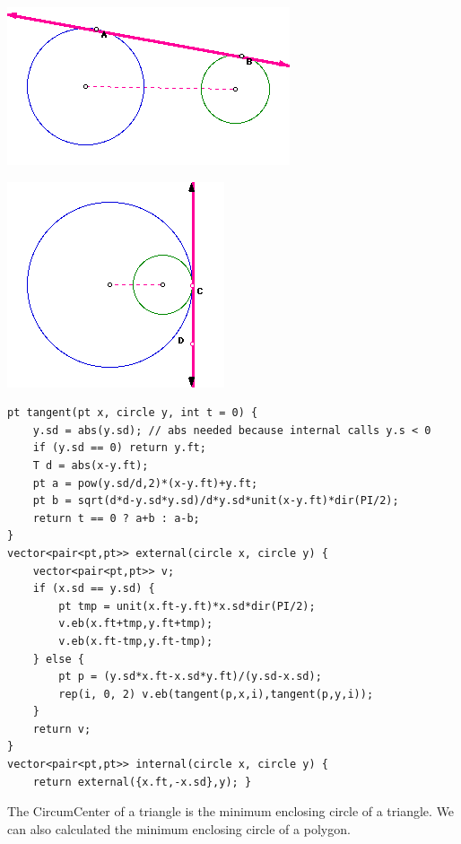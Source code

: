     
    \begin{center}
    \begin{minipage}{.5\textwidth}
    \centering
    \includegraphics[scale = 0.5]{imgs/external1.png}
    \end{minipage}%
    \begin{minipage}{0.5\textwidth}
    \centering
    \includegraphics[scale = 0.5]{imgs/external2.png}
    \end{minipage}
    \end{center}
    
    \begin{lstlisting}
pt tangent(pt x, circle y, int t = 0) {
	y.sd = abs(y.sd); // abs needed because internal calls y.s < 0
	if (y.sd == 0) return y.ft;
	T d = abs(x-y.ft);
	pt a = pow(y.sd/d,2)*(x-y.ft)+y.ft;
	pt b = sqrt(d*d-y.sd*y.sd)/d*y.sd*unit(x-y.ft)*dir(PI/2); 
	return t == 0 ? a+b : a-b;
}
vector<pair<pt,pt>> external(circle x, circle y) { 
	vector<pair<pt,pt>> v; 
	if (x.sd == y.sd) {
		pt tmp = unit(x.ft-y.ft)*x.sd*dir(PI/2);
		v.eb(x.ft+tmp,y.ft+tmp);
		v.eb(x.ft-tmp,y.ft-tmp);
	} else {
		pt p = (y.sd*x.ft-x.sd*y.ft)/(y.sd-x.sd);
		rep(i, 0, 2) v.eb(tangent(p,x,i),tangent(p,y,i));
	}
	return v;
}
vector<pair<pt,pt>> internal(circle x, circle y) { 
	return external({x.ft,-x.sd},y); }
    \end{lstlisting}

    The CircumCenter of a triangle is the minimum enclosing circle of a triangle.
    We can also calculated the minimum enclosing circle of a polygon.

